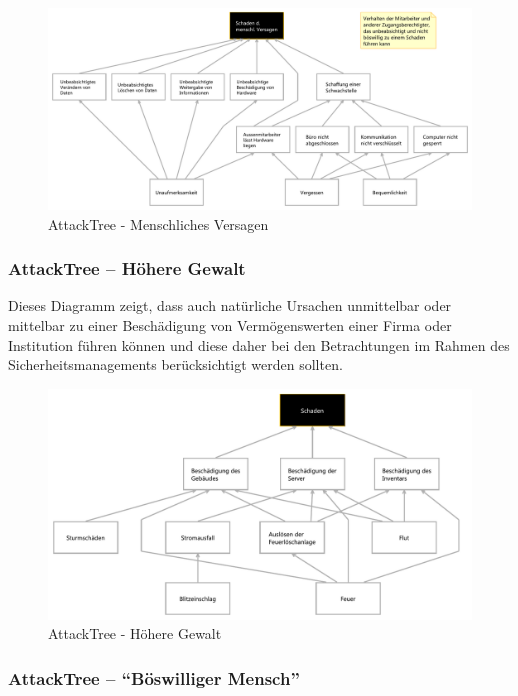 \begin{figure}[h]
\includegraphics[scale=0.75, angle=90]{images/MenschlichesVersagen.pdf}
\caption{AttackTree - Menschliches Versagen}
\end{figure}
\clearpage

\subsubsection{AttackTree – Höhere Gewalt}

Dieses Diagramm zeigt, dass auch natürliche Ursachen unmittelbar oder mittelbar zu einer Beschädigung von Vermögenswerten einer Firma oder Institution führen können und diese daher bei den Betrachtungen im Rahmen des Sicherheitsmanagements berücksichtigt werden sollten.

\begin{figure}[h]
\includegraphics[scale=0.70, angle=90]{images/HoehereGewalt.pdf}
\caption{AttackTree - Höhere Gewalt}
\end{figure}
\clearpage

\subsubsection{AttackTree – "`Böswilliger Mensch"'}

